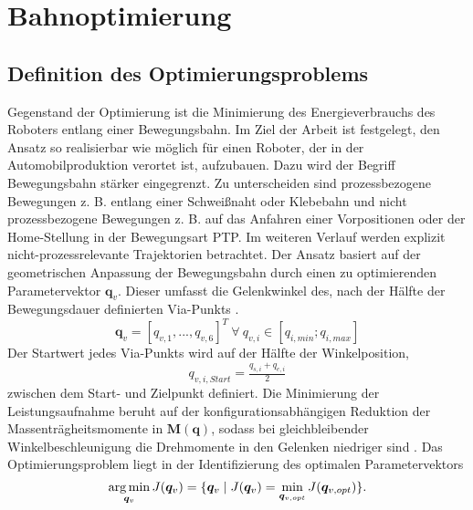 \chapter{Bahnoptimierung}
%
\section{Definition des Optimierungsproblems}
Gegenstand der Optimierung ist die Minimierung des Energieverbrauchs des Roboters entlang einer Bewegungsbahn. Im Ziel der Arbeit ist festgelegt, den Ansatz so realisierbar wie möglich für einen Roboter, der in der Automobilproduktion verortet ist, aufzubauen. Dazu wird der Begriff Bewegungsbahn stärker eingegrenzt. Zu unterscheiden sind prozessbezogene Bewegungen z. B. entlang einer Schweißnaht oder Klebebahn und nicht prozessbezogene Bewegungen z. B. auf das Anfahren einer Vorpositionen oder der Home-Stellung in der Bewegungsart PTP. Im weiteren Verlauf werden explizit nicht-prozessrelevante Trajektorien betrachtet. Der Ansatz basiert auf der geometrischen Anpassung  der Bewegungsbahn durch einen zu optimierenden Parametervektor $\bm{q}_{v}$. Dieser umfasst die Gelenkwinkel des, nach der Hälfte der Bewegungsdauer definierten Via-Punkts \cite[S-~56]{Hansen.2012}.
%
\begin{equation}
	\bm{q}_{v} = [q_{v,1},...,q_{v,6}]^T ~\forall~ q_{v,i} \in [q_{i,min};q_{i,max}]
\end{equation}
%
Der Startwert jedes Via-Punkts wird auf der Hälfte der Winkelposition,
\begin{equation}
	q_{v,i,Start} = \tfrac{q_{s,i}+q_{e,i}}{2}
\end{equation}
zwischen dem Start- und Zielpunkt definiert. Die Minimierung der Leistungsaufnahme beruht auf der konfigurationsabhängigen Reduktion der  Massenträgheitsmomente in $\bm{M}(\bm{q})$, sodass bei gleichbleibender Winkelbeschleunigung die Drehmomente in den Gelenken niedriger sind \cite[S.~531]{Ziaukas.2017}. Das Optimierungsproblem liegt in der Identifizierung des optimalen Parametervektors  
%
%
\begin{equation}
	\operatorname*{arg\,min}_{\bm{q}_{v}} J(\bm{q}_{v}) = \{\bm{q}_{v} \mid J(\bm{q}_{v}) = \min_{\bm{q}_{v,opt}} J(\bm{q}_{v,opt})\}.
\end{equation}
%
